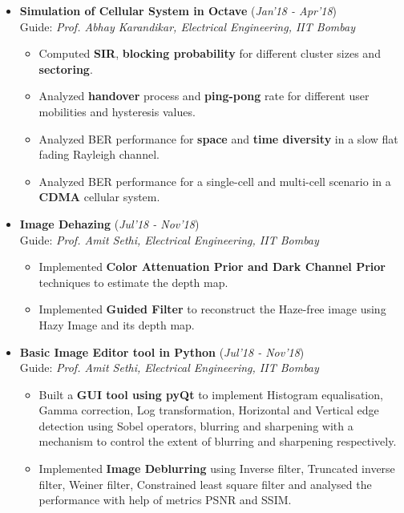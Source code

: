 \documentclass[10pt]{article}
\begin{document}
\begin{itemize}[leftmargin=0.4cm]
\item \textbf{Simulation of Cellular System in Octave}
\hfill{(\textit{Jan'18 - Apr'18})}\\
Guide: \textit{Prof. Abhay Karandikar, Electrical Engineering, IIT Bombay}
	\begin{itemize}
	\item Computed \textbf{SIR}, \textbf{blocking probability} for different cluster sizes and \textbf{sectoring}.
	\item Analyzed \textbf{handover} process and \textbf{ping-pong} rate for different user mobilities and hysteresis values.
	\item Analyzed BER performance for \textbf{space} and \textbf{time diversity} in a slow flat fading Rayleigh channel.
	\item Analyzed BER performance for a single-cell and multi-cell scenario in a \textbf{CDMA} cellular system.
    \end{itemize}

		
	



\item \textbf{Image Dehazing  } \hfill{(\textit{Jul'18 - Nov'18})}\\
Guide: \textit{Prof. Amit Sethi, Electrical Engineering, IIT Bombay}
	\begin{itemize}
	\item Implemented \textbf{Color Attenuation Prior and Dark Channel Prior} techniques to estimate the depth map.
	\item Implemented \textbf{Guided Filter} to reconstruct the Haze-free image using Hazy Image and its depth map.
	\end{itemize}
	

\item \textbf{Basic Image Editor tool in Python 
} 
\hfill{(\textit{Jul'18 - Nov'18})}\\
Guide: \textit{Prof. Amit Sethi, Electrical Engineering, IIT Bombay}
	\begin{itemize}
	\item Built a \textbf{GUI tool using pyQt} to implement Histogram equalisation, Gamma correction, Log transformation, Horizontal and Vertical edge detection using Sobel operators, blurring and sharpening with a mechanism to control the extent of blurring and sharpening respectively.
	\item Implemented \textbf{Image Deblurring} using Inverse filter, Truncated inverse filter, Weiner filter, Constrained least square filter and analysed the performance with help of metrics PSNR and SSIM.
	\end{itemize}



\end{itemize}
\end{document}
